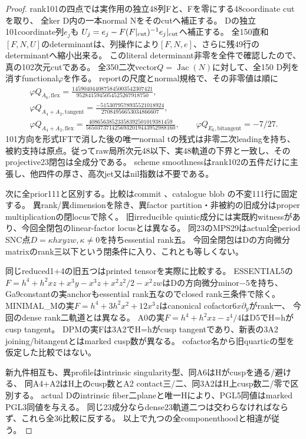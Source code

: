 \documentclass[a4paper,11pt]{ltjsarticle}
\theoremstyle{definition}
\begin{document}
\begin{proof}
rank101の四点では実作用の独立48列Fと、Fを零にする48coordinate cutを取り、
全ker D内の一本normal Nをそのcutへ補正する。
Dの独立101coordinate列$e_j$も
$U_j=e_j-F(F|_{\rm cut})^{-1}e_j|_{\rm cut}$へ補正する。
全150直和$[F,N,U]$のdeterminantは、列操作により$[F,N,e]$、さらに残49行のdeterminantへ縮小出来る。
このliteral determinant非零を全件で確認したので、真の102次元cutである。
全350二次vector$Q=\operatorname{Jac}(N)$に対して、全150 D列を消すfunctional$\varphi$を作る。
reportの尺度とnormal規格で、その非零値は順に
\[
\begin{gathered}
 \varphi Q_{A_6,\mathrm{flex}}=\frac{1459040440875845003542307421}{9528415945054525267918750},\\
 \varphi Q_{A_4+A_2,\mathrm{tangent}}=\frac{-5153079578935521018924}{27084956653034866607},\\
 \varphi Q_{A_4+A_2,\mathrm{flex}}=\frac{40865638523358392501019381459}{5650373714256932019443952988160},\qquad
 \varphi Q_{E_6,\mathrm{bitangent}}=-7/27.
\end{gathered}
\]
101方向を形式IFTで消した後の唯一normal tの残式は非零二次leadingを持ち、
被約支持は原点。従ってraw局所次元48以下、実48軌道の下界と一致し、そのprojective23閉包は全成分である。
scheme smoothnessはrank102の五件だけに主張し、他四件の厚さ、高次jet又はnil指数は不要である。

次に全prior111と区別する。比較はcommit
、catalogue blob
の不変111行に固定する。
異rank/異dimensionを除き、異factor partition・非被約の旧成分はproper multiplicationの閉locusで除く。
旧irreducible quintic成分には実既約witnessがあり、今回全閉包のlinear-factor locusとは異なる。
同23のMPS29はactual全period SNC点$D=\kappa hxyzw,\kappa\ne0$を持ちessential rank五。
今回全閉包はDの方向微分matrixのrank三以下という閉条件に入り、これとも等しくない。

同じreduced1+4の旧五つはprinted tensorを実際に比較する。
ESSENTIAL5の$F=h^4+h^2xz+x^3y-x^3z+x^2z^2/2-x^2zw$はDの方向微分minor$-5$を持ち、
Ga9constantの実anchorもessential rank五なのでclosed rank三条件で除く。
MINIMAL\_Mの実$F=h^4+3h^2x^2+12x^3z$はcanonical cofactor$6x\partial_y$がrank一、
今回のdense rank二軌道とは異なる。
A0の実$F=h^4+h^2xz-z^4/4$はD5でH=hがcusp tangent。
DPMの実Fは3A2でH=hがcusp tangentであり、新表の3A2 joining/bitangentとはmarked cusp数が異なる。
cofactor名から旧quarticの型を仮定した比較ではない。

新九件相互も、異profileはintrinsic singularity型、同A6はHがcuspを通る/避ける、
同A4+A2はH上のcusp数とA2 contact三/二、同3A2はH上cusp数二/零で区別する。
actual Dのintrinsic fiber二planeと唯一Hにより、PGL5同値はmarked PGL3同値を与える。
同じ23成分ならdense23軌道二つは交わらなければならず、これら全36比較に反する。
以上で九つの全componenthoodと相違が従う。
\end{proof}
\end{document}
